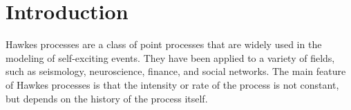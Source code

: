 \chapter{Introduction}



Hawkes processes are a class of point processes that are widely used in the modeling of self-exciting events. They have been applied to a variety of fields, such as seismology, 
neuroscience, finance, and social networks. The main feature of Hawkes processes is that the intensity or rate of the process is not constant, but depends on the history of the process itself.
